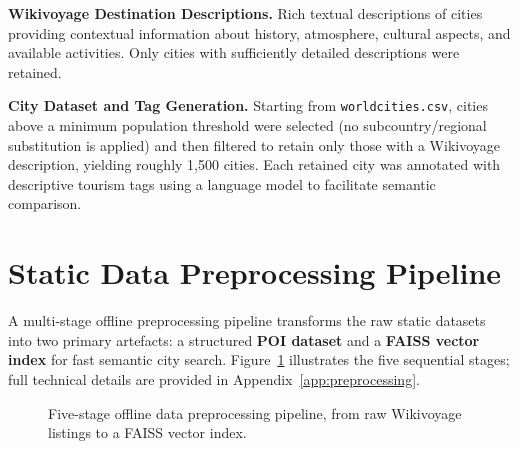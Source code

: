 \documentclass[12pt,a4paper]{report}
\begin{document}
\textbf{Wikivoyage Destination Descriptions.} Rich textual descriptions of cities providing
contextual information about history, atmosphere, cultural aspects, and available activities. Only
cities with sufficiently detailed descriptions were retained.

\textbf{City Dataset and Tag Generation.} Starting from \texttt{worldcities.csv}, cities above a
minimum population threshold were selected (no subcountry/regional substitution is applied) and then
filtered to retain only those with a Wikivoyage description, yielding roughly 1,500 cities. Each
retained city was annotated with descriptive tourism tags using a language model to facilitate
semantic comparison.

\section{Static Data Preprocessing Pipeline}
\label{sec:preprocessing}

A multi-stage offline preprocessing pipeline transforms the raw static datasets into two primary
artefacts: a structured \textbf{POI dataset} and a \textbf{FAISS vector index} for fast semantic
city search. Figure~\ref{fig:preprocessing} illustrates the five sequential stages; full technical
details are provided in Appendix~\ref{app:preprocessing}.

\begin{figure}[H]
\centering
{}%
\caption{Five-stage offline data preprocessing pipeline, from raw Wikivoyage listings to a FAISS
         vector index.}
\label{fig:preprocessing}
\end{figure}
\end{document}
